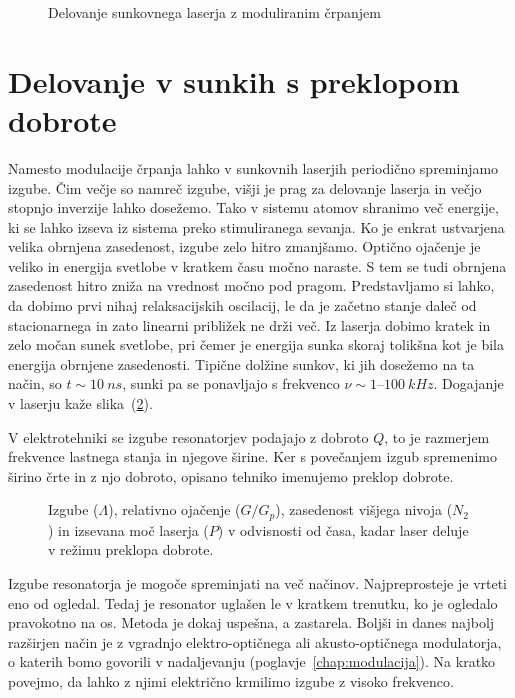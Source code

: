 \begin{figure}[h]
\centering
\def\svgwidth{90truemm} 

\caption{Delovanje sunkovnega laserja z moduliranim črpanjem}
\label{fig:pulseG}
\end{figure}

\section{Delovanje v sunkih s preklopom dobrote}
Namesto modulacije črpanja lahko v sunkovnih laserjih periodično spreminjamo 
izgube. Čim večje so namreč izgube, višji je prag za delovanje laserja in 
večjo stopnjo inverzije lahko dosežemo. Tako v sistemu atomov shranimo več 
energije, ki se lahko izseva iz sistema preko stimuliranega sevanja. 
Ko je enkrat ustvarjena velika obrnjena zasedenost, izgube zelo hitro zmanjšamo. 
Optično ojačenje je veliko in energija svetlobe v kratkem času močno naraste. 
S tem se tudi obrnjena zasedenost hitro zniža na vrednost močno pod pragom.
Predstavljamo si lahko, da dobimo prvi nihaj relaksacijskih oscilacij, le da
je začetno stanje daleč od stacionarnega in zato linearni približek ne drži več.
Iz laserja dobimo kratek in zelo močan sunek svetlobe, pri čemer je energija
sunka skoraj tolikšna kot je bila energija obrnjene zasedenosti. Tipične
dolžine sunkov, ki jih dosežemo na ta način, so $t \sim 10~\si{ns}$, sunki
pa se ponavljajo s frekvenco $\nu \sim 1$--$100~\si{kHz}$.
Dogajanje v laserju kaže slika~(\ref{fig:pulseQ}).

\begin{remark}
V elektrotehniki se izgube resonatorjev podajajo z dobroto $Q$, to je razmerjem
frekvence lastnega stanja in njegove širine. Ker s povečanjem izgub spremenimo 
širino črte in z njo dobroto, opisano tehniko imenujemo preklop dobrote. 
\end{remark}

\begin{figure}[h]
\centering
\def\svgwidth{90truemm} 

\caption{Izgube ($\Lambda$), relativno ojačenje ($G/G_p$), zasedenost višjega 
nivoja ($N_2$) in izsevana moč laserja ($P$) v odvisnosti od časa, kadar laser 
deluje v režimu preklopa dobrote.}
\label{fig:pulseQ}
\end{figure}

Izgube resonatorja je mogoče spreminjati na več načinov. Najpreprosteje
je vrteti eno od ogledal. Tedaj je resonator uglašen le v kratkem
trenutku, ko je ogledalo pravokotno na os. Metoda je dokaj uspešna, a
zastarela. Boljši in danes najbolj razširjen način je z vgradnjo
elektro-optičnega ali akusto-optičnega modulatorja, o katerih
bomo govorili v nadaljevanju (poglavje~\ref{chap:modulacija}). Na kratko povejmo, 
da lahko z njimi električno krmilimo izgube z visoko frekvenco.

